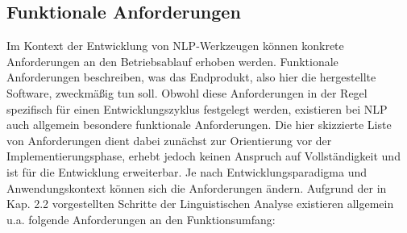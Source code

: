 \documentclass[12pt]{report}
\begin{document}
\subsection{Funktionale Anforderungen}
Im Kontext der Entwicklung von NLP-Werkzeugen können konkrete Anforderungen an den Betriebsablauf erhoben werden. Funktionale Anforderungen beschreiben, was das Endprodukt, also hier die hergestellte Software, zweckmäßig tun soll. Obwohl diese Anforderungen in der Regel spezifisch für einen Entwicklungszyklus festgelegt werden, existieren bei NLP auch allgemein besondere funktionale Anforderungen. Die hier skizzierte Liste von Anforderungen dient dabei zunächst zur Orientierung vor der Implementierungsphase, erhebt jedoch keinen Anspruch auf Vollständigkeit und ist für die Entwicklung erweiterbar. Je nach Entwicklungsparadigma und Anwendungskontext können sich die Anforderungen ändern. Aufgrund der in Kap. 2.2 vorgestellten Schritte der Linguistischen Analyse existieren allgemein u.a. folgende Anforderungen an den Funktionsumfang:
\end{document}
